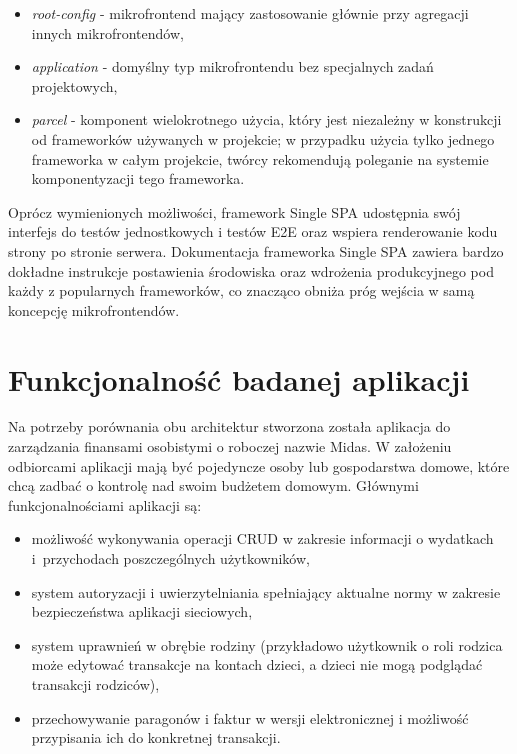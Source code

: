 \documentclass{SGGW-thesis}
\begin{document}
\begin{itemize}
	\item \textit{root-config} - mikrofrontend mający zastosowanie głównie przy agregacji innych mikrofrontendów,
	\item \textit{application} - domyślny typ mikrofrontendu bez specjalnych zadań projektowych,
	\item \textit{parcel} - komponent wielokrotnego użycia, który jest niezależny w konstrukcji od frameworków używanych w projekcie; w przypadku użycia tylko jednego frameworka w całym projekcie, twórcy rekomendują \cite{singlespa-parcels} poleganie na systemie komponentyzacji tego frameworka.
\end{itemize}

Oprócz wymienionych możliwości, framework Single SPA udostępnia swój interfejs do testów jednostkowych i testów E2E oraz wspiera renderowanie kodu strony po stronie serwera. Dokumentacja frameworka Single SPA zawiera bardzo dokładne instrukcje postawienia środowiska oraz wdrożenia produkcyjnego pod każdy z popularnych frameworków, co znacząco obniża próg wejścia w samą koncepcję mikrofrontendów.

\chapter{Funkcjonalność badanej aplikacji}
Na potrzeby porównania obu architektur stworzona została aplikacja do zarządzania finansami osobistymi o roboczej nazwie Midas. W założeniu odbiorcami aplikacji mają być pojedyncze osoby lub gospodarstwa domowe, które chcą zadbać o kontrolę nad swoim budżetem domowym. Głównymi funkcjonalnościami aplikacji są:

\begin{itemize}
	\item możliwość wykonywania operacji CRUD w zakresie informacji o wydatkach i~przychodach poszczególnych użytkowników,
	\item system autoryzacji i uwierzytelniania spełniający aktualne normy w zakresie bezpieczeństwa aplikacji sieciowych,
	\item system uprawnień w obrębie rodziny (przykładowo użytkownik o roli rodzica może edytować transakcje na kontach dzieci, a dzieci nie mogą podglądać transakcji rodziców),
	\item przechowywanie paragonów i faktur w wersji elektronicznej i możliwość przypisania ich do konkretnej transakcji.
\end{itemize}
\end{document}
